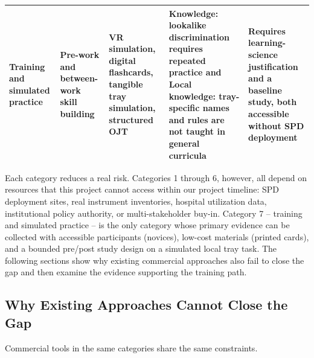 \documentclass[10pt,a4paper]{article}
\begin{document}
\begin{table}[H]
\begin{tabularx}{\textwidth}{|>{\raggedright\arraybackslash}p{2.2cm}|>{\raggedright\arraybackslash}p{1.8cm}|>{\raggedright\arraybackslash}X|>{\raggedright\arraybackslash}p{3cm}|>{\raggedright\arraybackslash}X|}
\hline
Training and simulated practice & Pre-work and between-work skill building & VR simulation, digital flashcards, tangible tray simulation, structured OJT & Knowledge: lookalike discrimination requires repeated practice and Local knowledge: tray-specific names and rules are not taught in general curricula & Requires learning-science justification and a baseline study, both accessible without SPD deployment \\
\hline
\end{tabularx}
\end{table}
Each category reduces a real risk. Categories 1 through 6, however, all depend
on resources that this project cannot access within our project timeline: SPD
deployment sites, real instrument inventories, hospital utilization data,
institutional policy authority, or multi-stakeholder buy-in. Category 7 --
training and simulated practice -- is the only category whose primary evidence
can be collected with accessible participants (novices), low-cost materials
(printed cards), and a bounded pre/post study design on a simulated local tray
task. The following sections show why existing commercial approaches also fail to close the gap and then examine the evidence supporting the training path.
\subsection{Why Existing Approaches Cannot Close the Gap}


Commercial tools in the same categories share the same constraints.
\end{document}
